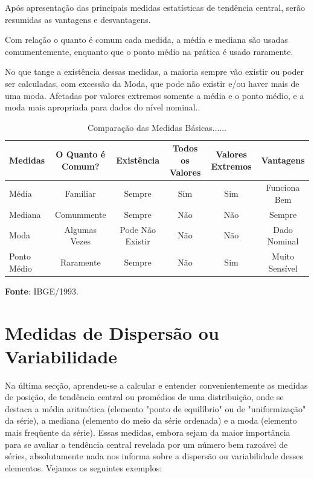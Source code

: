 \inic Após apresentação das principais medidas estatísticas de tendência central, serão resumidas as vantagens e desvantagens.\vskip0.3cm

\inic Com relação o quanto é comum cada medida, a média e mediana são usadas comumentemente, enquanto que o ponto médio na prática é usado raramente.\vskip0.3cm


\inic No que tange a existência dessas medidas, a maioria sempre vão existir ou poder ser calculadas, com excessão da Moda, que pode não existir e/ou haver mais de uma moda. Afetadas por valores extremos somente a média e o ponto médio, e a moda mais apropriada para dados do nível nominal..

\begin{table}
\centering
    {
\caption{Comparação das Medidas Básicas......}
\label{tabelarotacionada2}
    \vspace{0.2cm}
\begin{tabular}{l|c|c|c|c|c}
\hline
   Medidas  & O Quanto é Comum? & Existência        & Todos os Valores & Valores Extremos & Vantagens      \\
\hline\hline
   Média    & Familiar          & Sempre            & Sim              & Sim              & Funciona Bem    \\
   Mediana  & Comummente        & Sempre            & Não              & Não              & Sempre          \\
   Moda     & Algumas Vezes     & Pode Não Existir  & Não              & Não              & Dado Nominal    \\ 
Ponto Médio & Raramente         & Sempre            & Não              & Sim              & Muito Sensível  \\  
   \hline\hline 
\end{tabular}} 
\vspace{-1.5cm}
\textbf{Fonte}: IBGE/1993. 
\end{table}



\newpage
\section{Medidas de Dispersão ou Variabilidade}


Na última secção, aprendeu-se a calcular e entender convenientemente as medidas de posição, de tendência central ou promédios de uma distribuição, onde se destaca a média aritmética (elemento "ponto de equilíbrio" ou de "uniformização" da série), a mediana (elemento do meio da série ordenada) e a moda (elemento mais freqüente da série). Essas medidas, embora sejam da maior importância para se avaliar a tendência central revelada por um número bem razoável de séries, absolutamente nada nos informa sobre a dispersão ou variabilidade desses elementos.  Vejamos os seguintes exemplos:\vskip0.3cm

